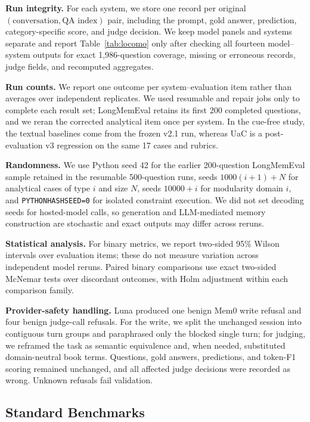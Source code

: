 \documentclass[letterpaper]{article} %
\begin{document}
\textbf{Run integrity.} For each system, we store one record per original $(\text{conversation},\text{QA index})$ pair, including the prompt, gold answer, prediction, category-specific score, and judge decision. We keep model panels and systems separate and report Table~\ref{tab:locomo} only after checking all fourteen model--system outputs for exact 1{,}986-question coverage, missing or erroneous records, judge fields, and recomputed aggregates.

\textbf{Run counts.} We report one outcome per system--evaluation item rather than averages over independent replicates. We used resumable and repair jobs only to complete each result set; LongMemEval retains its first 200 completed questions, and we reran the corrected analytical item once per system. In the cue-free study, the textual baselines come from the frozen v2.1 run, whereas UaC is a post-evaluation v3 regression on the same 17 cases and rubrics.

\textbf{Randomness.} We use Python seed 42 for the earlier 200-question LongMemEval sample retained in the resumable 500-question runs, seeds $1000(i+1)+N$ for analytical cases of type $i$ and size $N$, seeds $10000+i$ for modularity domain $i$, and \texttt{PYTHONHASHSEED=0} for isolated constraint execution. We did not set decoding seeds for hosted-model calls, so generation and LLM-mediated memory construction are stochastic and exact outputs may differ across reruns.

\textbf{Statistical analysis.} For binary metrics, we report two-sided 95\% Wilson intervals over evaluation items; these do not measure variation across independent model reruns. Paired binary comparisons use exact two-sided McNemar tests over discordant outcomes, with Holm adjustment within each comparison family.

\textbf{Provider-safety handling.} Luna produced one benign Mem0 write refusal and four benign judge-call refusals. For the write, we split the unchanged session into contiguous turn groups and paraphrased only the blocked single turn; for judging, we reframed the task as semantic equivalence and, when needed, substituted domain-neutral book terms. Questions, gold answers, predictions, and token-F1 scoring remained unchanged, and all affected judge decisions were recorded as wrong. Unknown refusals fail validation.

\subsection{Standard Benchmarks}
\end{document}
